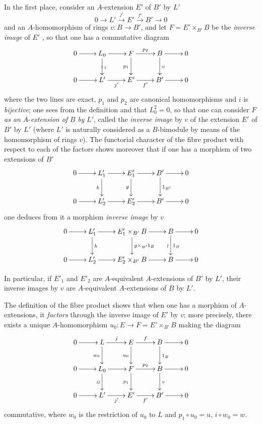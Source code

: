 \begin{env}[18.2.5]
\label{0.18.2.5}
In the first place, consider an $A$-extension $E'$ of $B'$ by $L'$
\[
  0\to L'\xrightarrow{j'} E'\xrightarrow{f'} B'\to 0
\]
and an $A$-homomorphism of rings $v:B\to B'$, and let $F=E'\times_{B'} B$ be the \emph{inverse image} of $E'$ , so that one has a commutative diagram
\[
  \xymatrix{
    0\ar[r] & L_0\ar[r]\ar[d]^{i}\ar@{}[d]|{\wr} & F\ar[r]^{p_2}\ar[d]_{p_1} & B\ar[r]\ar[d]^v & 0\\
    0\ar[r] & L'\ar[r]_{j'} & E'\ar[r]_{f'} & B'\ar[r] & 0
  }
\]
where the two lines are exact, $p_1$ and $p_2$ are canonical homomorphisms and $i$ is \emph{bijective}; one sees from the definition  and  that $L_0^2=0$, so that one can consider $F$ \emph{as an} $A$-\emph{extension of} $B$ \emph{by} $L'$, called the \emph{inverse image} by $v$ of the extension $E'$ of $B'$ by $L'$ (where $L'$ is naturally considered as a $B$-bimodule by means of the homomorphism of rings $v$).
The functorial character
of the fibre product with respect to each of the factors shows moreover that if one has a morphism of two extensions of $B'$
\[
  \xymatrix{
    0\ar[r] & L'_1\ar[r]\ar[d]_h & E'_1\ar[r]\ar[d]_g & B'\ar[r]\ar[d]^{1_{B'}} & 0\\
    0\ar[r] & L'_2\ar[r] & E'_2\ar[r] & B'\ar[r] & 0
  }
\]
one deduces from it a morphism \emph{inverse image} by $v$
\[
  \xymatrix{
    0\ar[r] & L'_1\ar[r]\ar[d]^h & E'_1\times_{B'}B\ar[r]\ar[d]^{g\times_{B'}1_B} & B\ar[r]\ar[d]^{1_B}_{\wr} & 0\\
    0\ar[r] & L'_2\ar[r] & E'_2\times_{B'}B\ar[r] & B\ar[r] & 0
  }
\]

In particular, if $E'_1$ and $E'_2$ are $A$-equivalent $A$-extensions of $B'$ by $L'$, their inverse images by $v$ are $A$-equivalent $A$-extensions of $B$ by $L'$.

The definition of the fibre product shows that when one has a morphism  of $A$-extensions, it \emph{factors} through the inverse image of $E'$ by $v$; more precisely, there exists a unique $A$-homomorphism $u_0:E\to F=E'\times_{B'}B$ making the diagram
\[
  \xymatrix{
    0\ar[r] & L\ar[r]^j\ar[d]_{w_0} & E\ar[r]^f\ar[d]_{u_0} & B\ar[r]\ar[d]^{1_B} & 0\\
    0\ar[r] & L_0\ar[r]\ar[d]_{i\wr} & F\ar[r]^{p_2}\ar[d]_{p_1} & B\ar[r]\ar[d]^v & 0\\
    0\ar[r] & L'\ar[r]_{j'} & E'\ar[r]_{f'} & B'\ar[r] & 0
  }
\]
commutative, where $w_0$ is the restriction of $u_0$ to $L$ and $p_1\circ u_0=u$, $i\circ w_0=w$.
\end{env}

